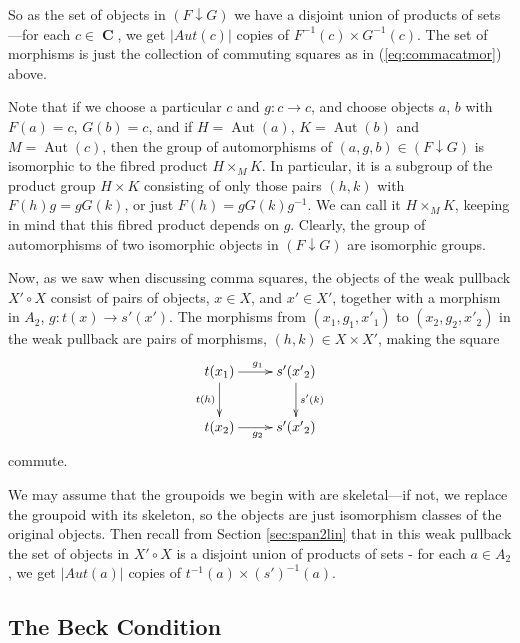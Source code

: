 \documentclass[10pt]{amsart}
\numberwithin{theorem}{subsection}
\newcommand{\ra}{\mathop{\rightarrow}}
\newcommand{\opname}[1]{\operatorname{#1}}
\newcommand{\catname}[1]{\boldsymbol{\opname{{#1}}}}
\begin{document}
So as the set of objects in $(F \downarrow G)$ we have a disjoint
union of products of sets---for each $c \in \catname{C}$, we get
$|Aut(c)|$ copies of $F^{-1}(c) \times G^{-1}(c)$.  The set of
morphisms is just the collection of commuting squares as in
(\ref{eq:commacatmor}) above.

Note that if we choose a particular $c$ and $g: c \ra c$, and choose
objects $a$, $b$ with $F(a)=c$, $G(b)=c$, and if $H=\opname{Aut}(a)$,
$K=\opname{Aut}(b)$ and $M=\opname{Aut}(c)$, then the group of
automorphisms of $(a,g,b) \in (F \downarrow G)$ is isomorphic to the
fibred product $H \times_M K$.  In particular, it is a subgroup of the
product group $H \times K$ consisting of only those pairs $(h,k)$ with
$F(h) g = g G(k)$, or just $F(h) = g G(k) g^{-1}$.  We can call it $H
\times_M K$, keeping in mind that this fibred product depends on $g$.
Clearly, the group of automorphisms of two isomorphic objects in $(F
\downarrow G)$ are isomorphic groups.





Now, as we saw when discussing comma squares, the objects of the weak
pullback ${X' \circ X}$ consist of pairs of objects, $x \in
X$, and $x' \in X'$, together with a morphism in $A_2$, $g
: t(x) \ra s'(x')$.  The morphisms from $(x_1,g_1,{x'}_1)$ to
$(x_2,g_2,{x'}_2)$ in the weak pullback are pairs of morphisms, $(h,k) \in
{X} \times  {X'}$, making the square
\begin{equation}
\xymatrix{
t(x_1) \ar[r]^{g_1} \ar[d]_{t(h)} & s'({x'}_2) \ar[d]^{s'(k)} \\
t(x_2) \ar[r]_{g_2} & s'({x'}_2)
}
\end{equation}
commute.

We may assume that the groupoids we begin with are skeletal---if not,
we replace the groupoid with its skeleton, so the objects are just
isomorphism classes of the original objects.  Then recall from Section
\ref{sec:span2lin} that in this weak pullback the set of objects in
${X' \circ X}$ is a disjoint union of products of sets - for each $a
\in {A_2}$, we get $|Aut(a)|$ copies of ${t}^{-1}(a) \times
(s')^{-1}(a)$.

\subsection{The Beck Condition}
\end{document}

